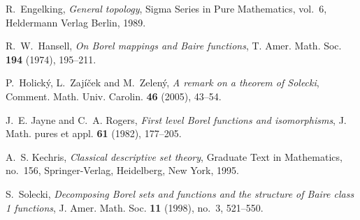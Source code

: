 \documentclass{rae}
\theoremstyle{definition}
\begin{document}
\begin{thebibliography}{}

R.~Engelking, \emph{General topology}, Sigma Series in Pure 
  Mathematics, vol.~6, Heldermann Verlag Berlin, 1989.

R.~W.~Hansell, \emph{On Borel mappings and Baire functions},
T. Amer. Math. Soc. \textbf{194} (1974), 195--211.

P.~Holick\'y, L.~Zaj\'i\v{c}ek and M.~Zelen\'y, \emph{A remark on a
  theorem of Solecki}, Comment. Math. Univ. Carolin. \textbf{46}
(2005), 43--54.

J.~E. Jayne and C.~A. Rogers, \emph{First level {B}orel functions and 
isomorphisms}, J. Math. pures et appl. \textbf{61} (1982), 177--205.

A.~S. Kechris, \emph{Classical descriptive set theory}, Graduate Text in
  Mathematics, no.~156, Springer-Verlag, Heidelberg, New York, 1995.


S.~Solecki, \emph{Decomposing {B}orel sets and functions and the structure of
  {B}aire class 1 functions}, J. Amer. Math. Soc. \textbf{11} (1998), no.~3,
  521--550.

\end{thebibliography}
\end{document}
